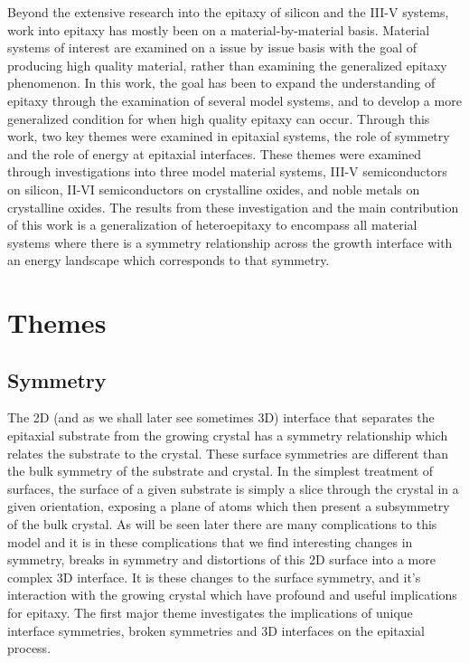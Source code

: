 Beyond the extensive research into the epitaxy of silicon and the III-V systems, work into epitaxy has mostly been on a material-by-material basis.
Material systems of interest are examined on a issue by issue basis with the goal of producing high quality material, rather than examining the generalized epitaxy phenomenon.
In this work, the goal has been to expand the understanding of epitaxy through the examination of several model systems, and to develop a more generalized condition for when high quality epitaxy can occur.
Through this work, two key themes were examined in epitaxial systems, the role of symmetry and the role of energy at epitaxial interfaces.
These themes were examined through investigations into three model material systems, III-V semiconductors on silicon, II-VI semiconductors on crystalline oxides, and noble metals on crystalline oxides.
The results from these investigation and the main contribution of this work is a generalization of heteroepitaxy to encompass all material systems where there is a symmetry relationship across the growth interface with an energy landscape which corresponds to that symmetry.

\section{Themes}
\subsection{Symmetry}
The 2D (and as we shall later see sometimes 3D) interface that separates the epitaxial substrate from the growing crystal has a symmetry relationship which relates the substrate to the crystal.
These surface symmetries are different than the bulk symmetry of the substrate and crystal.
In the simplest treatment of surfaces, the surface of a given substrate is simply a slice through the crystal in a given orientation, exposing a plane of atoms which then present a subsymmetry of the bulk crystal.
As will be seen later there are many complications to this model and it is in these complications that we find interesting changes in symmetry, breaks in symmetry and distortions of this 2D surface into a more complex 3D interface.
It is these changes to the surface symmetry, and it's interaction with the growing crystal which have profound and useful implications for epitaxy.
The first major theme investigates the implications of unique interface symmetries, broken symmetries and 3D interfaces on the epitaxial process.

